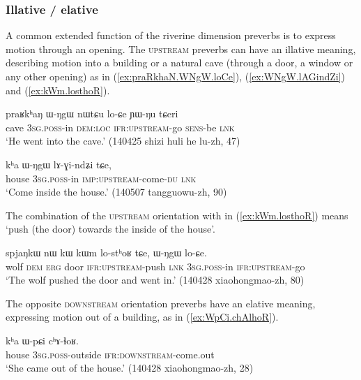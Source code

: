 \subsubsection{Illative / elative} \label{sec:illative.elative}
A common extended function of the riverine dimension preverbs is to express motion through an opening. The \textsc{upstream} preverbs can have an illative meaning, describing motion into a building or a natural cave (through a door, a window or any other opening) as in (\ref{ex:praRkhaN.WNgW.loCe}), (\ref{ex:WNgW.lAGindZi}) and (\ref{ex:kWm.losthoR}).

\begin{exe}
\ex \label{ex:praRkhaN.WNgW.loCe}
\gll  praʁkʰaŋ ɯ-ŋgɯ nɯtɕu lo-ɕe ɲɯ-ŋu tɕeri \\
cave \textsc{3sg}.\textsc{poss}-in \textsc{dem}:\textsc{loc} \textsc{ifr}:\textsc{upstream}-go \textsc{sens}-be \textsc{lnk} \\
\glt `He went into the cave.' (140425 shizi huli he lu-zh, 47)
\end{exe}

\begin{exe}
\ex \label{ex:WNgW.lAGindZi}
\gll   kʰa ɯ-ŋgɯ lɤ-ɣi-ndʑi tɕe,   \\
  house  \textsc{3sg}.\textsc{poss}-in \textsc{imp}:\textsc{upstream}-come-\textsc{du} \textsc{lnk}   \\
\glt `Come inside the house.' (140507 tangguowu-zh, 90)
\end{exe}

The combination of the \textsc{upstream} orientation with  in (\ref{ex:kWm.losthoR}) means `push (the door) towards the inside of the house'.

\begin{exe}
\ex \label{ex:kWm.losthoR}
\gll spjaŋkɯ nɯ kɯ kɯm lo-stʰoʁ tɕe, ɯ-ŋgɯ lo-ɕe. \\
wolf \textsc{dem} \textsc{erg} door \textsc{ifr}:\textsc{upstream}-push \textsc{lnk} \textsc{3sg}.\textsc{poss}-in \textsc{ifr}:\textsc{upstream}-go \\
\glt `The wolf pushed the door and went in.' (140428 xiaohongmao-zh, 80)
\end{exe}

The  opposite \textsc{downstream} orientation preverbs have an elative meaning, expressing motion out of a building, as in (\ref{ex:WpCi.chAlhoR}).

\begin{exe}
\ex \label{ex:WpCi.chAlhoR}
\gll  kʰa ɯ-pɕi cʰɤ-ɬoʁ. \\
house \textsc{3sg}.\textsc{poss}-outside \textsc{ifr}:\textsc{downstream}-come.out \\
\glt `She came out of the house.' (140428 xiaohongmao-zh, 28)
\end{exe}

